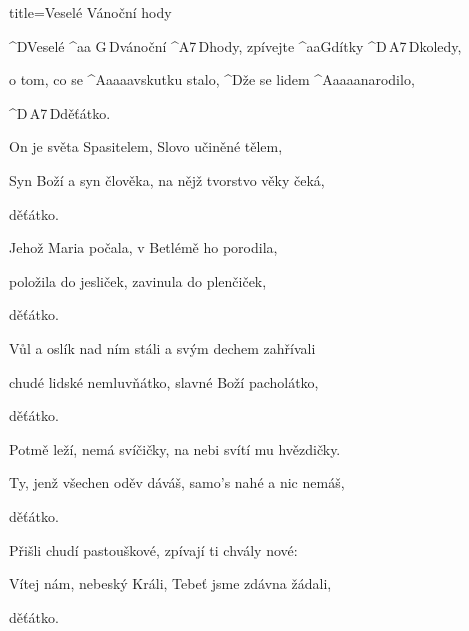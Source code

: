 \begin{song}{title=\predtitle\centering Veselé Vánoční hody \\\large   \vspace*{-0.3cm}}  %
\begin{centerjustified}
\nejnejvetsi

\sloka
	^{D}Veselé ^{{\color{white}aa}\,\,G\,D}vánoční ^{A7\,D}hody, zpívejte ^{{\color{white}aa}G}dítky ^{D\,A7\,D}koledy,

	o tom, co se ^{A{\color{white}aaaa}}vskutku stalo, ^{D}že se lidem ^{A{\color{white}aaaa}}narodilo,

	^{D\,A7\,D}děťátko.

\sloka
	On je světa Spasitelem, Slovo učiněné tělem,

	Syn Boží a syn člověka, na nějž tvorstvo věky čeká,

	děťátko.

\sloka
	Jehož Maria počala, v Betlémě ho porodila,

	položila do jesliček, zavinula do plenčiček,

	děťátko.

\sloka
	Vůl a oslík nad ním stáli a svým dechem zahřívali

	chudé lidské nemluvňátko, slavné Boží pacholátko,

	děťátko.

\sloka
	Potmě leží, nemá svíčičky, na nebi svítí mu hvězdičky.

	Ty, jenž všechen oděv dáváš, samo's nahé a nic nemáš,

	děťátko.

\sloka
	Přišli chudí pastouškové, zpívají ti chvály nové:

	Vítej nám, nebeský Králi, Tebeť jsme zdávna žádali,

	děťátko.

\end{centerjustified}
\setcounter{Slokočet}{0}
\end{song}

